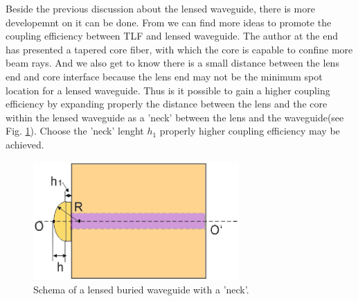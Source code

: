 Beside the previous discussion about the lensed waveguide, there is more developemnt on it can be done. From \cite{integrated_coupling_between_LD_SMF} we can find more ideas to promote the coupling efficiency between TLF and lensed waveguide. The author at the end has presented a tapered core fiber, with which the core is capable to confine more beam rays. And we also get to know there is a small distance between the lens end and core interface because the lens end may not be the minimum spot location for a lensed waveguide. Thus is it possible to gain a higher coupling efficiency by expanding properly the distance between the lens and the core within the lensed waveguide as a 'neck' between the lens and the waveguide(see Fig. \ref{fig:lensed_waveguide_neck}). Choose the 'neck' lenght $h_{1}$ properly higher coupling efficiency may be achieved.

\begin{figure}[!ht]
\centering
\includegraphics[width=0.7\textwidth]{bilder/lensed_waveguide_neck}
\caption{Schema of a lensed buried waveguide with a 'neck'.}
\label{fig:lensed_waveguide_neck}
\end{figure}
